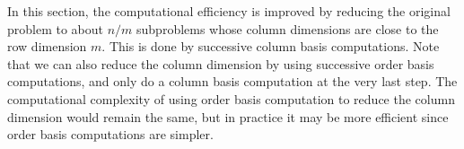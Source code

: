 \begin{rem}
In this section, the computational efficiency is improved by reducing
the original problem to about $n/m$ subproblems whose column dimensions
are close to the row dimension $m$. This is done by successive column
basis computations. Note that we can also reduce the column dimension
by using successive order basis computations, and only do a column
basis computation at the very last step. The computational complexity
of using order basis computation to reduce the column dimension would
remain the same, but in practice it may be more efficient since order
basis computations are simpler. \end{rem}

